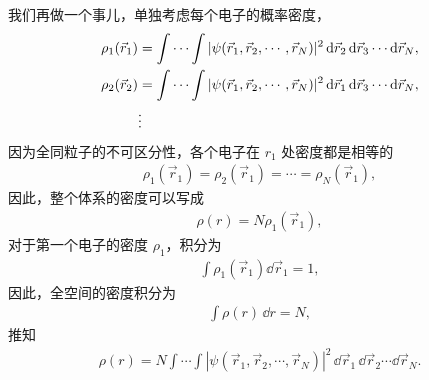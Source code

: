 我们再做一个事儿，单独考虑每个电子的概率密度，
\begin{align}
    \rho_1 (\vec r_1) &= \int \cdots \int |\psi(\vec r_1, \vec r_2, \cdots, \vec r_N)|^2 \, \mathrm{d}\vec r_2\, \mathrm{d}\vec r_3 \cdots \mathrm{d}\vec r_N, \\
    \rho_2 (\vec r_2) &= \int \cdots \int |\psi(\vec r_1, \vec r_2, \cdots, \vec r_N)|^2 \, \mathrm{d}\vec r_1\, \mathrm{d}\vec r_3 \cdots \mathrm{d}\vec r_N, \\
    &\vdots \notag
\end{align}
因为全同粒子的不可区分性，各个电子在 $r_1$ 处密度都是相等的
\begin{align}
\rho_1(\vec r_1) = \rho_2(\vec r_1) = \cdots = \rho_N(\vec r_1),
\end{align}
因此，整个体系的密度可以写成
\begin{align}
    \rho(r) = N \rho_1(\vec r_1),
\end{align}
对于第一个电子的密度 $\rho_1$，积分为
\begin{align}
    \int \rho_1 (\vec r_1) \dd\vec r_1 = 1,
\end{align}
因此，全空间的密度积分为
\begin{align}
    \int\rho(r) \,\dd r = N,
\end{align}
推知
\begin{align}
\rho(r) = N \int\!\cdots\!\int |\psi(\vec r_1, \vec r_2, \cdots, \vec r_N)|^2 \, \dd\vec r_1\, \dd\vec r_2 \cdots \dd\vec r_N. 
\end{align}


